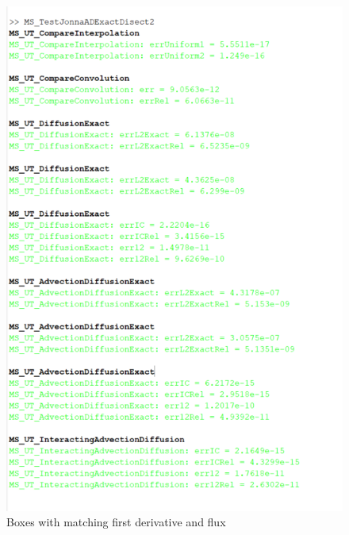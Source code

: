 \documentclass[11pt, a4paper]{article}
\theoremstyle{definition}
\begin{document}
\begin{figure}[h]
		\includegraphics[scale=0.7]{rhoFluxmatch.png}
		\caption{Boxes with matching first derivative and flux} 
		\label{F1}
	\end{figure}
\end{document}
